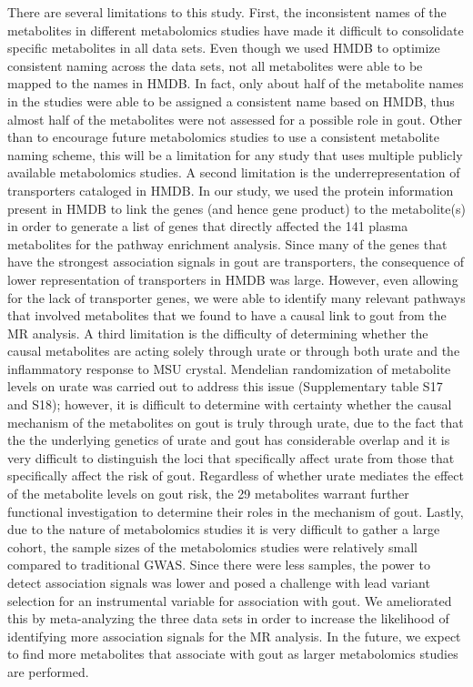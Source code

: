 \documentclass[a4paper,10pt]{article}
\begin{document}
There are several limitations to this study.
First, the inconsistent names of the metabolites in different metabolomics studies have made it difficult to consolidate specific metabolites in all data sets.
Even though we used HMDB to optimize consistent naming across the data sets, not all metabolites were able to be mapped to the names in HMDB.
In fact, only about half of the metabolite names in the studies were able to be assigned a consistent name based on HMDB, thus almost half of the metabolites were not assessed for a possible role in gout.
Other than to encourage future metabolomics studies to use a consistent metabolite naming scheme, this will be a limitation for any study that uses multiple publicly available metabolomics studies.
A second limitation is the underrepresentation of transporters cataloged in HMDB.
In our study, we used the protein information present in HMDB to link the genes (and hence gene product) to the metabolite(s) in order to generate a list of genes that directly affected the 141 plasma metabolites for the pathway enrichment analysis.
Since many of the genes that have the strongest association signals in gout are transporters, the consequence of lower representation of transporters in HMDB was large.
However, even allowing for the lack of transporter genes, we were able to identify many relevant pathways that involved metabolites that we found to have a causal link to gout from the MR analysis.
A third limitation is the difficulty of determining whether the causal metabolites are acting solely through urate or through both urate and the inflammatory response to MSU crystal.
Mendelian randomization of metabolite levels on urate was carried out to address this issue (Supplementary table S17 and S18); however, it is difficult to determine with certainty whether the causal mechanism of the metabolites on gout is truly through urate, due to the fact that the the underlying genetics of urate and gout has considerable overlap and it is very difficult to distinguish the loci that specifically affect urate from those that specifically affect the risk of gout.
Regardless of whether urate mediates the effect of the metabolite levels on gout risk, the 29 metabolites warrant further functional investigation to determine their roles in the mechanism of gout.
Lastly, due to the nature of metabolomics studies it is very difficult to gather a large cohort, the sample sizes of the metabolomics studies were relatively small compared to traditional GWAS.
Since there were less samples, the power to detect association signals was lower and posed a challenge with lead variant selection for an instrumental variable for association with gout.
We ameliorated this by meta-analyzing the three data sets in order to increase the likelihood of identifying more association signals for the MR analysis.
In the future, we expect to find more metabolites that associate with gout as larger metabolomics studies are performed.
\\
\end{document}
